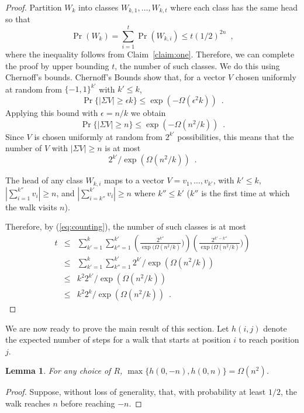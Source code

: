 \documentclass{article}
\newtheorem{lem}{Lemma}
\begin{document}
\begin{proof}
Partition $W_k$ into classes $W_{k,1},\ldots,W_{k,t}$ where each class has
the same head so that
\[
  \Pr(W_k) = \sum_{i=1}^t \Pr(W_{k,i}) \le t(1/2)^{2n} \enspace ,
\]
where the inequality follows from Claim~\ref{claim:one}.  Therefore, we
can complete the proof by upper bounding $t$, the number of such classes.
We do this using Chernoff's bounds.
Chernoff's Bounds show that, for a 
vector $V$ chosen uniformly at random from $\{-1,1\}^{k'}$ with $k' \le k$,
\[
   \Pr\{|\Sigma V| \ge \epsilon k\} \le \exp({-\Omega(\epsilon^2 k)}) \enspace .
\]
Applying this bound with $\epsilon = n/k$ we obtain
\[
   \Pr\{|\Sigma V| \ge n\} \le \exp({-\Omega(n^2/k)}) \enspace .
\]
Since $V$ is chosen uniformly at random from $2^{k'}$ possibilities,
this means that the number of $V$ with $|\Sigma V| \ge n$ is at most
\begin{equation}
  2^{k'}/\exp({\Omega(n^2/k)}) \enspace.
  \label{eq:counting}
\end{equation}

The head of any class $W_{k,i}$ maps to a vector $V=v_1,\ldots,v_{k'}$,
with $k'\le k$, $\left|\sum_{i=1}^{k''} v_i \right| \ge n$, and
$\left|\sum_{i=k''}^{k'} v_i \right| \ge n$ where $k'' \le k'$ ($k''$
is the first time at which the walk visits $n$).

Therefore, by (\ref{eq:counting}), the number of such classes is at most
\begin{eqnarray*}
  t & \le & \sum_{k'=1}^{k}\sum_{k''=1}^{k'} 
     \left(\frac{2^{k''}}{\exp({\Omega(n^2/k)}})\right)
     \left(\frac{2^{k'-k''}}{\exp({\Omega(n^2/k)}})\right) \\
   & \le & \sum_{k'=1}^{k}\sum_{k''=1}^{k'} 2^{k'}/\exp({\Omega(n^2/k)}) \\
   & \le & k^2 2^{k'}/\exp({\Omega(n^2/k)}) \\
   & \le & k^2 2^{k}/\exp({\Omega(n^2/k)}) \enspace .
\end{eqnarray*}
\end{proof}

We are now ready to prove the main result of this section.  Let $h(i,j)$ denote the expected number of steps for a walk that starts at position $i$ to reach position $j$.

\begin{lem}
For any choice of $R$, $\max\{h(0,-n), h(0,n)\} = \Omega(n^2)$.
\end{lem}

\begin{proof}
Suppose, without loss of generality, that, with probability at least $1/2$, the
walk reaches $n$ before reaching $-n$.



\end{proof}
\end{document}
